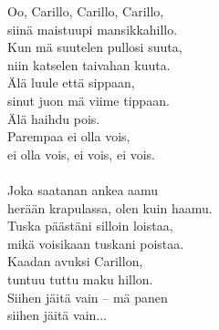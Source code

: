 
            Oo, Carillo, Carillo, Carillo, \\
            siinä maistuupi mansikkahillo. \\
            Kun mä suutelen pullosi suuta, \\
            niin katselen taivahan kuuta. \\
            Älä luule että sippaan, \\
            sinut juon mä viime tippaan. \\
            Älä haihdu pois. \\
            Parempaa ei olla vois, \\
            ei olla vois, ei vois, ei vois. \\
\hspace{10mm} \\
            Joka saatanan ankea aamu \\
            herään krapulassa, olen kuin haamu. \\
            Tuska päästäni silloin loistaa, \\
            mikä voisikaan tuskani poistaa. \\
            Kaadan avuksi Carillon, \\
            tuntuu tuttu maku hillon. \\
            Siihen jäitä vain – mä panen \\
            siihen jäitä vain... \\

